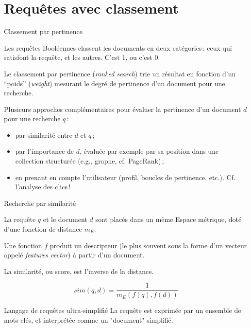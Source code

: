 


\section{Requêtes avec classement}

\begin{frame}{Classement par pertinence}

Les requêtes Booléennes classent les documents en deux catégories\,: ceux qui satisfont la requête, et les autres. C'est 1, ou c'est 0.

\vfill

Le \alert{classement par pertinence} (\textit{ranked search}) trie un résultat en fonction d'un ``poids'' (\textit{weight}) 
mesurant le degré de pertinence d'un document pour une recherche.


\vfill

Plusieurs approches complémentaires pour évaluer la pertinence d'un document $d$ pour une recherche $q$\,:

\begin{itemize}
  \item par \alert{similarité} entre $d$ et $q$\,;
  \item par \alert{l'importance} de $d$, évaluée par exemple par
       sa position dans une collection structurée  (e.g., graphe, cf. PageRank)\,;
  \item en prenant en compte  l'utilisateur (\alert{profil}, \alert{boucles de pertinence}, etc.). Cf. l'analyse des \alert{clics}\,!
\end{itemize}
\end{frame}

\begin{frame}{Recherche par similarité}


La requête $q$ \alert{et} le document $d$ sont placés 
     dans un même \alert{Espace métrique}, doté d'une fonction de distance $m_E$. 

\vfill

Une fonction $f$ produit un \alert{descripteur} (le plus souvent sous la forme d'un vecteur
appelé \textit{features vector})
à partir d'un document.
     
\vfill

La \alert{similarité}, ou \alert{score}, est l'inverse de la distance.

\[sim(q,d) = \frac{1}{m_E(f(q),f(d))}\]


\begin{block}{Langage de requêtes ultra-simplifié}
La requête est exprimée par un ensemble de mots-clés, et interprétée comme un "document" simplifié.
\end{block}

\end{frame}


